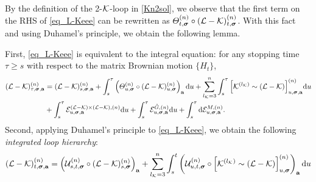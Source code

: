 By the definition of the 2-$\mathcal K$-loop in \eqref{Kn2sol}, we observe that the first term on the RHS of \eqref{eq_L-Keee} can be rewritten as ${\varTheta}^{(n)}_{t, {\boldsymbol{\sigma}}} \circ (\mathcal{L} - \mathcal{K})^{(n)}_{t,{\boldsymbol{\sigma}}}$. With this fact and using Duhamel's principle, we obtain the following lemma.


\begin{lemma} \label{Sol_CalL}
First, \eqref{eq_L-Keee} is equivalent to the integral equation: for any stopping time $\tau\ge s$ with respect to the matrix Brownian motion $\{H_t\}$,
\begin{align}\label{int_K-L_ST}
({\mathcal L}-{\mathcal K})^{(n)}_{\tau,{\boldsymbol{\sigma}},{{\mathbf{a}}}}&=({\mathcal L}-{\mathcal K})^{(n)}_{s,{\boldsymbol{\sigma}},{{\mathbf{a}}}}+\int_{s}^{\tau}\left({\varTheta^{(n)}_{u,{\boldsymbol{\sigma}}}\circ({\mathcal L}-{\mathcal K})^{(n)}_{u,{\boldsymbol{\sigma}}}}\right)_{{{\mathbf{a}}}}\mathrm{d} u+\sum_{l_\mathcal{K}=3}^n \int_s^\tau \Big[\mathcal{K}^{(l_{\mathcal K})} \sim (\mathcal{L} - \mathcal{K})\Big]^{(n)}_{u, {\boldsymbol{\sigma}}, {{\mathbf{a}}}}\mathrm{d} u \nonumber\\
&+ \int_s^\tau \mathcal{E}^{(\mathcal{L} - \mathcal{K}) \times (\mathcal{L} - \mathcal{K}),(n)}_{u, {\boldsymbol{\sigma}}, {{\mathbf{a}}}}\mathrm{d} u + \int_{s}^{\tau}\mathcal{E}^{{\mathring G},(n)}_{u, {\boldsymbol{\sigma}}, {{\mathbf{a}}}}\mathrm{d} u + \int_s^\tau \mathrm{d} \mathcal{E}^{M,(n)}_{u, {\boldsymbol{\sigma}}, {{\mathbf{a}}}} .
\end{align}
%    
Second, applying Duhamel's principle to \eqref{eq_L-Keee}, we obtain the following \emph{integrated loop hierarchy}:
\begin{align}\label{int_K-LcalE}
   & (\mathcal{L} - \mathcal{K})^{(n)}_{t, \bsig, \ba}  =
    \left(\mathcal{U}^{(n)}_{s, t, \bsig} \circ (\mathcal{L} - \mathcal{K})^{(n)}_{s, \bsig}\right)_{\ba} + \sum_{l_\mathcal{K} =3}^n \int_{s}^t \left(\mathcal{U}^{(n)}_{u, t, \bsig} \circ \Big[\cK^{(\lenk)}\sim (\mathcal{L} - \mathcal{K})\Big]^{(n)}_{u, \bsig}\right)_{\ba} \dd u \nonumber \\

\end{align}
\end{lemma}
